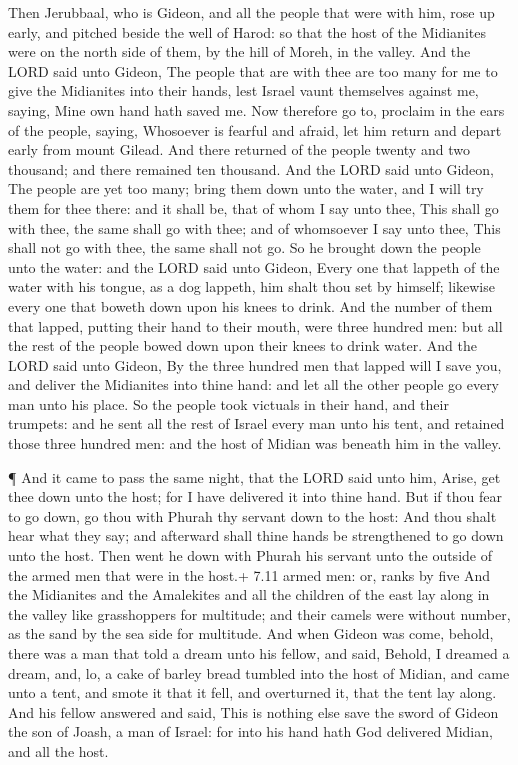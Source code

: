  Then Jerubbaal, who is Gideon, and all the people that were
with him, rose up early, and pitched beside the well of Harod: so that
the host of the Midianites were on the north side of them, by the hill
of Moreh, in the valley.  And the LORD said unto Gideon, The
people that are with thee are too many for me to give the Midianites
into their hands, lest Israel vaunt themselves against me, saying, Mine
own hand hath saved me.  Now therefore go to, proclaim in
the ears of the people, saying, Whosoever is fearful and afraid, let him
return and depart early from mount Gilead. And there returned of the
people twenty and two thousand; and there remained ten thousand.
 And the LORD said unto Gideon, The people are yet too many;
bring them down unto the water, and I will try them for thee there: and
it shall be, that of whom I say unto thee, This shall go with thee, the
same shall go with thee; and of whomsoever I say unto thee, This shall
not go with thee, the same shall not go.  So he brought down
the people unto the water: and the LORD said unto Gideon, Every one that
lappeth of the water with his tongue, as a dog lappeth, him shalt thou
set by himself; likewise every one that boweth down upon his knees to
drink.  And the number of them that lapped, putting their
hand to their mouth, were three hundred men: but all the rest of the
people bowed down upon their knees to drink water.  And the
LORD said unto Gideon, By the three hundred men that lapped will I save
you, and deliver the Midianites into thine hand: and let all the other
people go every man unto his place.  So the people took
victuals in their hand, and their trumpets: and he sent all the rest of
Israel every man unto his tent, and retained those three hundred men:
and the host of Midian was beneath him in the valley.

 ¶ And it came to pass the same night, that the LORD said
unto him, Arise, get thee down unto the host; for I have delivered it
into thine hand.  But if thou fear to go down, go thou with
Phurah thy servant down to the host:  And thou shalt hear
what they say; and afterward shall thine hands be strengthened to go
down unto the host. Then went he down with Phurah his servant unto the
outside of the armed men that were in the host.+ 7.11 armed men: or,
ranks by five  And the Midianites and the Amalekites and
all the children of the east lay along in the valley like grasshoppers
for multitude; and their camels were without number, as the sand by the
sea side for multitude.  And when Gideon was come, behold,
there was a man that told a dream unto his fellow, and said, Behold, I
dreamed a dream, and, lo, a cake of barley bread tumbled into the host
of Midian, and came unto a tent, and smote it that it fell, and
overturned it, that the tent lay along.  And his fellow
answered and said, This is nothing else save the sword of Gideon the son
of Joash, a man of Israel: for into his hand hath God delivered Midian,
and all the host.

